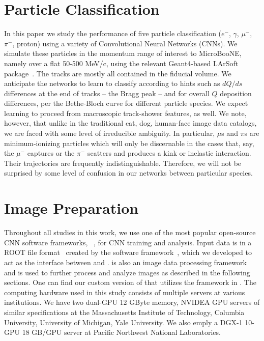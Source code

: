\documentclass[11pt,a4paper]{article}
\begin{document}
\section{Particle Classification}

In this paper we study the performance of five particle classification ($e^-$, $\gamma$, $\mu^-$, $\pi^-$, proton) using a variety of Convolutional Neural Networks (CNNs). We simulate these particles in the momentum range of interest to MicroBooNE, namely over a flat 50-500 MeV/c, using the relevant Geant4-based LArSoft package~\cite{larsoft050800}. The tracks are mostly all contained in the fiducial volume. We anticipate the networks to learn to classify according to hints such as $dQ/ds$ differences at the end of tracks -- the Bragg peak -- and for overall $Q$ deposition differences, per the Bethe-Bloch curve for different particle species. We expect learning to proceed from macroscopic track-shower features, as well. We note, however, that unlike in the traditional cat, dog, human-face image data catalogs, we are faced with some level of irreducible ambiguity. In particular, $\mu$s and $\pi$s are minimum-ionizing particles which will only be discernable in the cases that, say, the $\mu^-$ captures or the $\pi^-$ scatters and produces a kink or inelastic interaction. Their trajectories are frequently indistinguishable. Therefore, we will not be surprised by some level of confusion in our networks between particular species.

\section{Image Preparation}

Throughout all studies in this work, we use one of the most popular open-source CNN software frameworks, {}~\cite{caffe}, for CNN training and analysis. Input data is in a ROOT file format~\cite{ROOT} created by the {} software framework~\cite{LArCV}, which we developed to act as the interface between {} and {}. {} is also an image data processing framework and is used to further process and analyze images as described in the following sections. One can find our custom version of {} that utilizes the {} framework in \cite{LArCV}.  
The computing hardware used in this study consists of multiple servers at various institutions. We have two dual-GPU 12 GByte memory, NVIDEA GPU servers of similar specifications at the Massachusetts Institute of Technology, Columbia University,  University of Michigan, Yale University. We also emply a DGX-1 10-GPU 18 GB/GPU server at Pacific Northwest National Laboratories.
\end{document}

